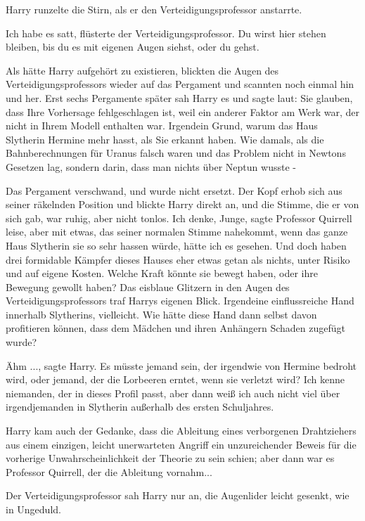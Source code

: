 Harry runzelte die Stirn, als er den Verteidigungsprofessor anstarrte.

\glqq{}Ich habe es satt\grqq{}, flüsterte der Verteidigungsprofessor. \glqq{}Du
wirst hier stehen bleiben, bis du es mit eigenen Augen siehst, oder du
gehst.\grqq{}

Als hätte Harry aufgehört zu existieren, blickten die Augen des
Verteidigungsprofessors wieder auf das Pergament und scannten noch einmal hin
und her. Erst sechs Pergamente später sah Harry es und sagte laut: \glqq{}Sie
glauben, dass Ihre Vorhersage fehlgeschlagen ist, weil ein anderer Faktor am
Werk war, der nicht in Ihrem Modell enthalten war. Irgendein Grund, warum das
Haus Slytherin Hermine mehr hasst, als Sie erkannt haben. Wie damals, als die
Bahnberechnungen für Uranus falsch waren und das Problem nicht in Newtons
Gesetzen lag, sondern darin, dass man nichts über Neptun wusste -\grqq{}

Das Pergament verschwand, und wurde nicht ersetzt. Der Kopf erhob sich aus
seiner räkelnden Position und blickte Harry direkt an, und die Stimme, die er
von sich gab, war ruhig, aber nicht tonlos. \glqq{}Ich denke, Junge\grqq{}, sagte
Professor Quirrell leise, aber mit etwas, das seiner normalen Stimme nahekommt,
\glqq{}wenn das ganze Haus Slytherin sie so sehr hassen würde, hätte ich es
gesehen. Und doch haben drei formidable Kämpfer dieses Hauses eher etwas getan
als nichts, unter Risiko und auf eigene Kosten. Welche Kraft könnte sie bewegt
haben, oder ihre Bewegung gewollt haben?\grqq{} Das eisblaue Glitzern in den
Augen des Verteidigungsprofessors traf Harrys eigenen Blick. \glqq{}Irgendeine
einflussreiche Hand innerhalb Slytherins, vielleicht. Wie hätte diese Hand dann
selbst davon profitieren können, dass dem Mädchen und ihren Anhängern Schaden
zugefügt wurde?\grqq{}

\glqq{}Ähm ...\grqq{}, sagte Harry. \glqq{}Es müsste jemand sein, der irgendwie
von Hermine bedroht wird, oder jemand, der die Lorbeeren erntet, wenn sie
verletzt wird? Ich kenne niemanden, der in dieses Profil passt, aber dann weiß
ich auch nicht viel über irgendjemanden in Slytherin außerhalb des ersten
Schuljahres.\grqq{}

Harry kam auch der Gedanke, dass die Ableitung eines verborgenen Drahtziehers
aus einem einzigen, leicht unerwarteten Angriff ein unzureichender Beweis für
die vorherige Unwahrscheinlichkeit der Theorie zu sein schien; aber dann war es
Professor Quirrell, der die Ableitung vornahm...

Der Verteidigungsprofessor sah Harry nur an, die Augenlider leicht gesenkt, wie
in Ungeduld.

